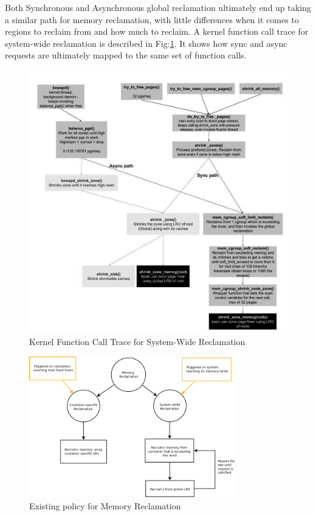       Both Synchronous and Asynchronous global reclamation ultimately end up taking a similar path for memory reclamation, with little 
differences when it comes to regions to reclaim from and how much to reclaim. A kernel function call trace for system-wide reclamation is 
described in Fig:\ref{img_call_trace}. It shows how sync and async requests are ultimately mapped to the same set of function calls.

      \begin{figure}
	\centering
	\includegraphics[width=1\textwidth]{images/reclamation_call_trace.jpg}
	\caption{Kernel Function Call Trace for System-Wide Reclamation}
	\label{img_call_trace}
      \end{figure}

      \begin{figure}
	\centering
	\includegraphics[width=0.8\textwidth]{images/High_level_Reclamation.png}
	\caption{Existing policy for Memory Reclamation}
	\label{img_high_level}
      \end{figure}  
      
